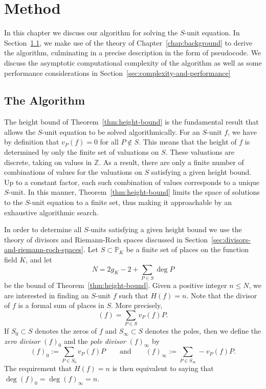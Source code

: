 
\chapter{Method}%
\label{chap:method}

In this chapter we discuss our algorithm for solving the \(S\)-unit equation. In Section~\ref{sec:the-algorithm}, we make use of the theory of Chapter~\ref{chap:background} to derive the algorithm, culminating in a precise description in the form of pseudocode. We discuss the asymptotic computational complexity of the algorithm as well as some performance considerations in Section~\ref{sec:complexity-and-performance}

\section{The Algorithm}%
\label{sec:the-algorithm}

The height bound of Theorem~\ref{thm:height-bound} is the fundamental result that allows the \(S\)-unit equation to be solved algorithmically. For an \(S\)-unit \(f\), we have by definition that \(v_{P}(f) = 0\) for all \(P \notin S\). This means that the height of \(f\) is determined by only the finite set of valuations on \(S\). These valuations are discrete, taking on values in \(\mathbb{Z}\). As a result, there are only a finite number of combinations of values for the valuations on \(S\) satisfying a given height bound. Up to a constant factor, each such combination of values corresponds to a unique \(S\)-unit. In this manner, Theorem~\ref{thm:height-bound} limits the space of solutions to the \(S\)-unit equation to a finite set, thus making it approachable by an exhaustive algorithmic search.

In order to determine all \(S\)-units satisfying a given height bound we use the theory of divisors and Riemann-Roch spaces discussed in Section~\ref{sec:divisors-and-riemann-roch-spaces}. Let \(S \subset \mathbb{P}_{K}\) be a finite set of places on the function field \(K\), and let
\[N = 2g_{K} - 2 + \sum_{P \in S} \deg{P}\]
be the bound of Theorem~\ref{thm:height-bound}. Given a positive integer \(n \leq N\), we are interested in finding an \(S\)-unit \(f\) such that \(H(f) = n\). Note that the divisor of \(f\) is a formal sum of places in \(S\). More precisely,
\[(f) = \sum_{P \in S} v_{P}(f) P.\]
If \(S_{0} \subset S\) denotes the zeros of \(f\) and \(S_{\infty} \subset S\) denotes the poles, then we define the \textit{zero divisor} \({(f)}_{0}\) and the \textit{pole divisor} \({(f)}_{\infty}\) by
\[{(f)}_{0} := \sum_{P \in S_{0}} v_{P}(f) P \qquad \text{and} \qquad {(f)}_{\infty} := \sum_{P \in S_{\infty}} - v_{P}(f) P.\]
The requirement that \(H(f) = n\) is then equivalent to saying that \(\deg{{(f)}_{0}} = \deg{{(f)}_{\infty}} = n\).

